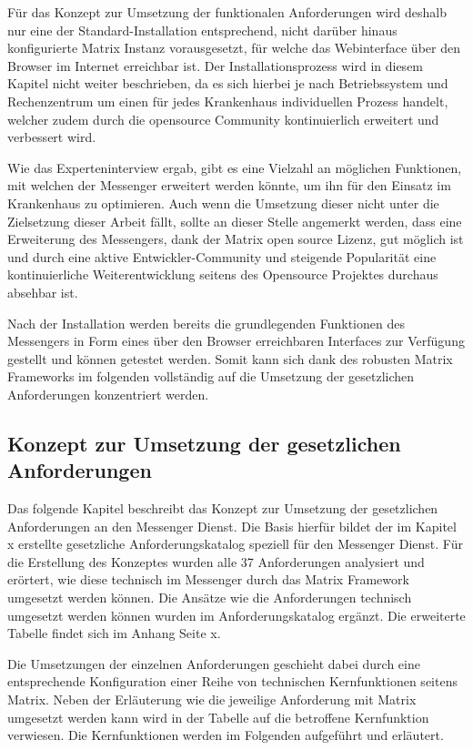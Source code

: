Für das Konzept zur Umsetzung der funktionalen Anforderungen wird deshalb nur eine der Standard-Installation entsprechend, nicht darüber hinaus konfigurierte Matrix Instanz vorausgesetzt, für welche das Webinterface über den Browser im Internet erreichbar ist.
Der Installationsprozess wird in diesem Kapitel nicht weiter beschrieben, da es sich hierbei je nach Betriebssystem und Rechenzentrum um einen für jedes Krankenhaus individuellen Prozess handelt, welcher zudem durch die opensource Community kontinuierlich erweitert und verbessert wird.

Wie das Experteninterview ergab, gibt es eine Vielzahl an möglichen Funktionen, mit welchen der Messenger erweitert werden könnte, um ihn für den Einsatz im Krankenhaus zu optimieren. Auch wenn die Umsetzung dieser nicht unter die Zielsetzung dieser Arbeit fällt, sollte an dieser Stelle angemerkt werden, dass eine Erweiterung des Messengers, dank der Matrix open source Lizenz, gut möglich ist und durch eine aktive Entwickler-Community und steigende Popularität eine kontinuierliche Weiterentwicklung seitens des Opensource Projektes durchaus absehbar ist.

Nach der Installation werden bereits die grundlegenden Funktionen des Messengers in Form eines über den Browser erreichbaren Interfaces zur Verfügung gestellt und können getestet werden. Somit kann sich dank des robusten Matrix Frameworks im folgenden vollständig auf die Umsetzung der gesetzlichen Anforderungen konzentriert werden.

\subsection{Konzept zur Umsetzung der gesetzlichen Anforderungen}\label{chapter:vdmf}
Das folgende Kapitel beschreibt das Konzept zur Umsetzung der gesetzlichen Anforderungen an den Messenger Dienst.
Die Basis hierfür bildet der im Kapitel x erstellte gesetzliche Anforderungskatalog speziell für den Messenger Dienst. Für die Erstellung des Konzeptes wurden alle 37 Anforderungen analysiert und erörtert, wie diese technisch im Messenger durch das Matrix Framework umgesetzt werden können. Die Ansätze wie die Anforderungen technisch umgesetzt werden können wurden im Anforderungskatalog ergänzt. Die erweiterte Tabelle findet sich im Anhang Seite x. 

Die Umsetzungen der einzelnen Anforderungen geschieht dabei durch eine entsprechende Konfiguration einer Reihe von technischen Kernfunktionen seitens Matrix. Neben der Erläuterung wie die jeweilige Anforderung mit Matrix umgesetzt werden kann wird in der Tabelle auf die betroffene Kernfunktion verwiesen. Die Kernfunktionen werden im Folgenden aufgeführt und erläutert.

